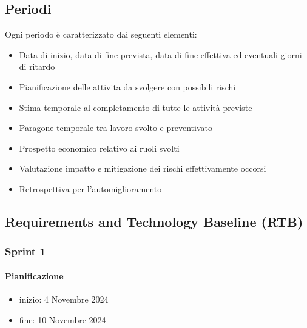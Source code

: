\documentclass{article}
\begin{document}
    \subsection{Periodi}
    Ogni periodo è caratterizzato dai seguenti elementi:
    \begin{itemize}
        \item Data di inizio, data di fine prevista, data di fine effettiva ed eventuali giorni di ritardo
        \item Pianificazione delle attivita da svolgere con possibili rischi
        \item Stima temporale al completamento di tutte le attività previste
        \item Paragone temporale tra lavoro svolto e preventivato
        \item Prospetto economico relativo ai ruoli svolti
        \item Valutazione impatto e mitigazione dei rischi effettivamente occorsi
        \item Retrospettiva per l'automiglioramento
    \end{itemize}


        \subsection{Requirements and Technology Baseline (RTB)}
            \subsubsection{Sprint 1}
                \paragraph{Pianificazione}
                \begin{itemize}
                    \item inizio: 4 Novembre 2024
                    \item fine: 10 Novembre 2024
                \end{itemize}
                
\end{document}
